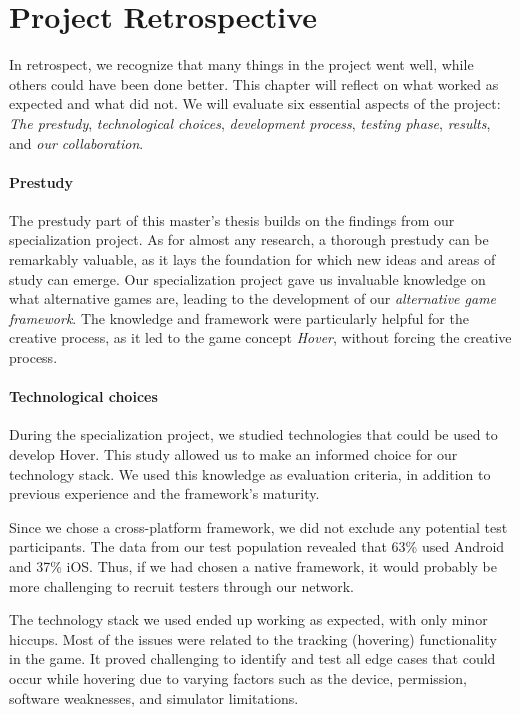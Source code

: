 \section{Project Retrospective}
\label{chap:retrospective}
In retrospect, we recognize that many things in the project went well, while others could have been done better. This chapter will reflect on what worked as expected and what did not. We will evaluate six essential aspects of the project: \textit{The prestudy}, \textit{technological choices}, \textit{development process}, \textit{testing phase}, \textit{results}, and \textit{our collaboration}.

\paragraph*{Prestudy}
The prestudy part of this master’s thesis builds on the findings from our specialization project. As for almost any research, a thorough prestudy can be remarkably valuable, as it lays the foundation for which new ideas and areas of study can emerge. Our specialization project gave us invaluable knowledge on what alternative games are, leading to the development of our \textit{alternative game framework}. The knowledge and framework were particularly helpful for the creative process, as it led to the game concept \textit{Hover}, without forcing the creative process. 

\paragraph*{Technological choices}
During the specialization project, we studied technologies that could be used to develop Hover. This study allowed us to make an informed choice for our technology stack. We used this knowledge as evaluation criteria, in addition to previous experience and the framework’s maturity.

Since we chose a cross-platform framework, we did not exclude any potential test participants. The data from our test population revealed that 63\% used Android and 37\% iOS. Thus, if we had chosen a native framework, it would probably be more challenging to recruit testers through our network. 

The technology stack we used ended up working as expected, with only minor hiccups. Most of the issues were related to the tracking (hovering) functionality in the game. It proved challenging to identify and test all edge cases that could occur while hovering due to varying factors such as the device, permission, software weaknesses, and simulator limitations.

